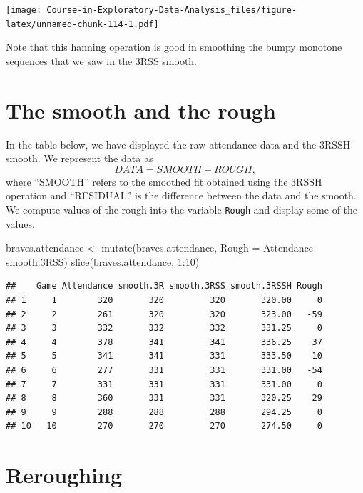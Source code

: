 \documentclass[
]{book}
\newenvironment{Shaded}{\begin{snugshade}}{\end{snugshade}}
\newcommand{\AttributeTok}[1]{\textcolor[rgb]{0.77,0.63,0.00}{#1}}
\newcommand{\DecValTok}[1]{\textcolor[rgb]{0.00,0.00,0.81}{#1}}
\newcommand{\FloatTok}[1]{\textcolor[rgb]{0.00,0.00,0.81}{#1}}
\newcommand{\FunctionTok}[1]{\textcolor[rgb]{0.00,0.00,0.00}{#1}}
\newcommand{\NormalTok}[1]{#1}
\newcommand{\OtherTok}[1]{\textcolor[rgb]{0.56,0.35,0.01}{#1}}
\newcommand{\SpecialCharTok}[1]{\textcolor[rgb]{0.00,0.00,0.00}{#1}}
\begin{document}
\texttt{[image: Course-in-Exploratory-Data-Analysis\_files/figure-latex/unnamed-chunk-114-1.pdf]}

Note that this hanning operation is good in smoothing the bumpy monotone sequences that we saw in the 3RSS smooth.

\hypertarget{the-smooth-and-the-rough}{%
\section{The smooth and the rough}\label{the-smooth-and-the-rough}}

In the table below, we have displayed the raw attendance data and the 3RSSH smooth. We represent the data as
\[
DATA = SMOOTH + ROUGH,
\]
where ``SMOOTH'' refers to the smoothed fit obtained using the 3RSSH operation and ``RESIDUAL'' is the difference between the data and the smooth. We compute values of the rough into the variable \texttt{Rough}
and display some of the values.

\begin{Shaded}
\begin{Highlighting}[]
\NormalTok{braves.attendance }\OtherTok{\textless{}{-}} \FunctionTok{mutate}\NormalTok{(braves.attendance,}
                  \AttributeTok{Rough =}\NormalTok{ Attendance }\SpecialCharTok{{-}}\NormalTok{ smooth}\FloatTok{.3}\NormalTok{RSS)}
\FunctionTok{slice}\NormalTok{(braves.attendance, }\DecValTok{1}\SpecialCharTok{:}\DecValTok{10}\NormalTok{)}
\end{Highlighting}
\end{Shaded}

\begin{verbatim}
##    Game Attendance smooth.3R smooth.3RSS smooth.3RSSH Rough
## 1     1        320       320         320       320.00     0
## 2     2        261       320         320       323.00   -59
## 3     3        332       332         332       331.25     0
## 4     4        378       341         341       336.25    37
## 5     5        341       341         331       333.50    10
## 6     6        277       331         331       331.00   -54
## 7     7        331       331         331       331.00     0
## 8     8        360       331         331       320.25    29
## 9     9        288       288         288       294.25     0
## 10   10        270       270         270       274.50     0
\end{verbatim}

\hypertarget{reroughing}{%
\section{Reroughing}\label{reroughing}}
\end{document}

